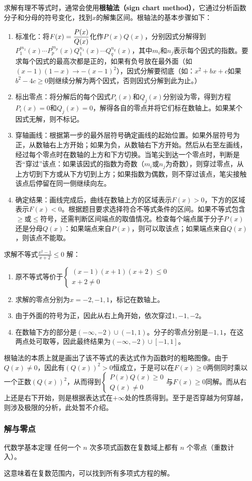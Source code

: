 求解有理不等式时，通常会使用\textbf{根轴法（sign chart method）}，它通过分析函数分子和分母的符号变化，找到$x$的解集区间。根轴法的基本步骤如下：
\begin{enumerate}
\item 标准化：将$\displaystyle F(x)={P(x)\over Q(x)}$化作$P(x)Q(x)$，分别因式分解得到$P^{m_1}_1(x)\cdots P^{m_p}_p(x)Q^{n_1}_1(x)\cdots Q^{n_q}_q(x)$，其中$m_i$和$n_j$表示每个因式的指数。要求每个因式的最高次都是正的，如果有负号放在最外面（如$(x-1)(1-x)\to-(x-1)^2$），因式分解要彻底（如：$x^2+bx+c$如果$b^2-4c\geq0$则继续分解为两个因式，否则因式分解到此为止。）
\item 标出零点：将分解后的每个因式$P_i(x)$和$Q_j(x)$分别设为零，得到方程$P_i(x) = 0$和$Q_j(x) = 0$，解得各自的零点并将它们标在数轴上。如果某个因式无解，则不标记。
\item 穿轴画线：根据第一步的最外层符号确定画线的起始位置。如果外层符号为正，从数轴右上方开始；如果为负，从数轴右下方开始。然后从右至左画线，经过每个零点时在数轴的上方和下方切换。当笔尖到达一个零点时，判断是否“穿过”该点：如果该因式的指数为奇数（$m_i$或$n_j$为奇数），则穿过零点，从上方切到下方或从下方切到上方；如果指数为偶数，则不穿过该点，笔尖接触该点后停留在同一侧继续向左。
\item 确定结果：画线完成后，曲线在数轴上方的区域表示$F(x) > 0$，下方的区域表示$F(x) < 0$。根据题目要求选择符合不等式条件的区间。如果不等式包含$\geq$或$\leq$符号，还需判断区间端点的取值情况。检查每个端点属于分子$P(x)$还是分母$Q(x)$：如果端点来自$P(x)$，则可以取该点；如果端点来自$Q(x)$，则该点不能取。
\end{enumerate}
\begin{example}{求解不等式$\displaystyle \frac{x^2 - 1}{x + 2} \leq 0$}
解：
\begin{enumerate}
\item 原不等式等价于$\begin{cases}(x-1)(x+1)(x+2)\leq0 \\ x+2\neq0\end{cases}$
\item 求解的零点分别为$x=-2,-1,1$，标记在数轴上。
\item 由于外面的符号为正，因此从右上角开始，依次穿过$1,-1,-2$。
\item 在数轴下方的部分是$(-\infty,-2)\cup(-1,1)$。分子的零点分别是$-1,1$，在这两点处可取等，因此最终结果为$(-\infty,-2)\cup[-1,1]$。
\end{enumerate}
\end{example}

根轴法的本质上就是画出了该不等式的表达式作为函数时的粗略图像。由于$Q(x)\neq0$，因此有$\left(Q(x)\right)^2>0$恒成立，于是可以在$F(x) \geq 0$两侧同时乘以一个正数$\left(Q(x)\right)^2$，从而得到$\begin{cases}P(x)Q(x)\geq0 \\ Q(x)\neq0\end{cases}$与$F(x) \geq 0$同解。而从右上还是右下开始，则是根据表达式在$+\infty$处的性质得到。至于是否穿越为何穿越，则涉及极限的分析，此处暂不介绍。

\subsubsection{解与零点}

\begin{definition}{代数学基本定理}
任何一个 $n$ 次多项式函数在复数域上都有 $n$ 个零点（重数计入）。
\end{definition}
这意味着在复数范围内，可以找到所有多项式方程的解。



